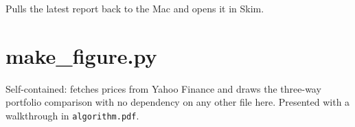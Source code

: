 \documentclass[11pt,a4paper]{article}
\begin{document}
Pulls the latest report back to the Mac and opens it in Skim.



\section{make\_figure.py}

Self-contained: fetches prices from Yahoo Finance and draws the
three-way portfolio comparison with no dependency on any other file
here. Presented with a walkthrough in \texttt{algorithm.pdf}.


\end{document}
